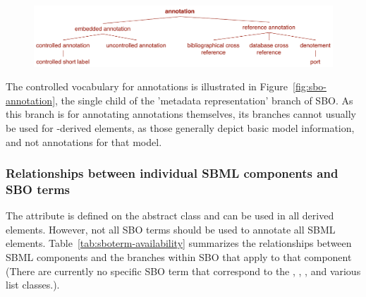 \begin{figure}[htb]
  \centering
  \includegraphics[scale = 0.87]{figs/sbo-annotation}
  \caption{}
  \label{fig:sbo-annotation}
\end{figure}

\begin{blockChanged}
The controlled vocabulary for annotations is illustrated in Figure~\vref{fig:sbo-annotation}, the single child of the 'metadata representation' branch of SBO.  As this branch is for annotating annotations themselves, its branches cannot usually be used for \SBase-derived elements, as those generally depict basic model information, and not annotations for that model.
\end{blockChanged}

\subsubsection{Relationships between individual SBML components and SBO terms}

The  attribute is defined on the abstract
  class \SBase and can be used in all derived elements.  However,
not all SBO terms should be used to annotate all
  SBML elements.  Table~\ref{tab:sboterm-availability} summarizes
the relationships between SBML components and the branches within
SBO that apply to that component (There are currently
  no specific SBO term that correspond to the \Sbml,
  \UnitDefinition, \Unit, and various
   list classes.).

